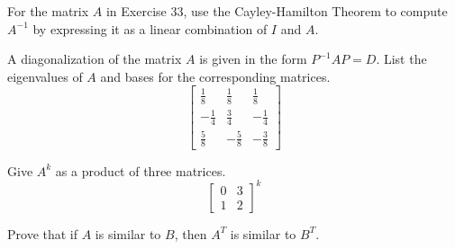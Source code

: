 \documentclass[12pt,letterpaper]{hmcpset}
\begin{document}
\begin{solution}
    \vfill
\end{solution}

\newpage

\begin{problem}[4.3 \#37]
    For the matrix $A$ in Exercise 33, use the Cayley-Hamilton Theorem to compute $A^{-1}$ by expressing it as a linear combination of $I$ and $A$.
\end{problem}

\begin{solution}
    \vfill
\end{solution}

\newpage

\begin{problem}[4.4 \#7]
    A diagonalization of the matrix $A$ is given in the form $P^{-1}AP=D$. List the eigenvalues of $A$ and bases for the corresponding matrices.
    \[
    \begin{bmatrix}
    \frac{1}{8} & \frac{1}{8} & \frac{1}{8} \\ 
    -\frac{1}{4} & \frac{3}{4} & -\frac{1}{4} \\ 
    \frac{5}{8} & -\frac{5}{8} & -\frac{3}{8}
    \end{bmatrix} 
    \]
\end{problem}

\begin{solution}
    \vfill
\end{solution}

\newpage

\begin{problem}[4.4 \#19]
    Give $A^k$ as a product of three matrices.
    \[
    \begin{bmatrix}
    0 & 3 \\ 
    1 & 2
    \end{bmatrix}^k
    \]
\end{problem}

\begin{solution}
    \vfill
\end{solution}

\newpage

\begin{problem}[4.4 \#42]
    Prove that if $A$ is similar to $B$, then $A^T$ is similar to $B^T$.
\end{problem}
\end{document}
